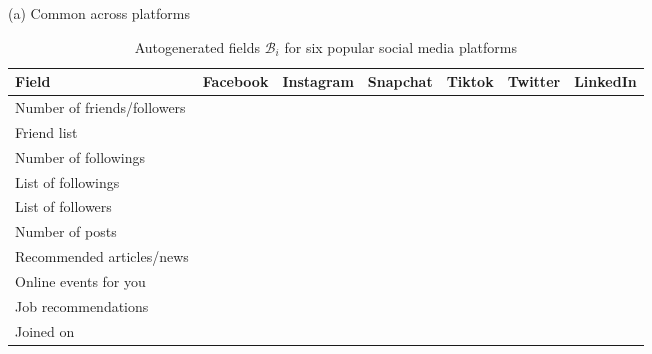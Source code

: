 \documentclass[11pt]{article} %
\newcommand{\cmark}{\ding{51}}%
\begin{document}
\begin{table}[tb]
\centering
\small
    \caption{Autogenerated fields $\mathcal{B}_i$ for six popular social media platforms}
    \label{tab:autogenerate}
    \vspace{1em}
(a) Common across platforms\\
    \vspace{1em}
            \begin{tabular}{lcccccc} 
            \toprule
Field &   Facebook &   Instagram &   Snapchat &   Tiktok &   Twitter &   LinkedIn \\ \midrule    
Number of friends/followers & \cmark    & \cmark     &          & \cmark  & \cmark   & \cmark    \\\hline
Friend list                 & \cmark    &           &          &        &         & \cmark    \\\hline
Number of followings        & \cmark    & \cmark     &          & \cmark  & \cmark   &          \\\hline
List of followings          & \cmark    & \cmark     &          &        & \cmark   &          \\\hline
List of followers           &          & \cmark     &          &        & \cmark   &          \\\hline
Number of posts             &          & \cmark     &          &        & \cmark   &          \\\hline
Recommended articles/news   & \cmark    &           & \cmark    &        & \cmark   & \cmark    \\\hline
Online events for you       & \cmark    &           &          &        &         & \cmark    \\\hline
Job recommendations         & \cmark    &           &          &        &         & \cmark    \\\hline
Joined on                   &          &           & \cmark    &        & \cmark   &         \\ \bottomrule
            \end{tabular} \\

\end{table}
\end{document}
